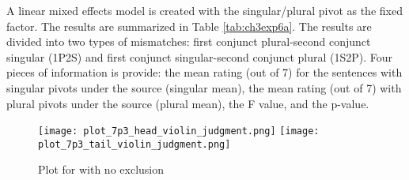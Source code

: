 \documentclass[
  11pt          %
  ,letterpaper  %
  ,center       %
  ,noupper      %
  ]{uconnthesis2}
\begin{document}
A linear mixed effects model is created with the singular/plural pivot as the fixed factor. The results are summarized in Table \ref{tab:ch3exp6a}. The results are divided into two types of mismatches: {first conjunct plural-second conjunct singular (1P2S)} and {first conjunct singular-second conjunct plural (1S2P)}. Four pieces of information is provide: the mean rating (out of 7) for the sentences with singular pivots under the source (singular mean), the mean rating (out of 7) with plural pivots under the source (plural mean), the F value, and the p-value.

\begin{figure}[h!] 
\texttt{[image: plot\_7p3\_head\_violin\_judgment.png]} \centering
\texttt{[image: plot\_7p3\_tail\_violin\_judgment.png]} \centering
\caption{Plot for with no exclusion}
\label{fig:ch3exp6b.violin}
\end{figure}
\end{document}
